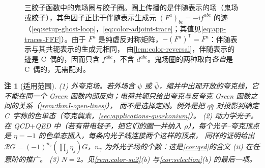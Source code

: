 \documentclass[UTF8,a4paper,11pt,fontset=fandol]{ctexart}
\theoremstyle{cplain}
\theoremstyle{cdefinition}
\theoremstyle{cremark}
\newtheorem{remark}[theorem]{注}
\numberwithin{equation}{section}
\DeclareMathOperator{\Tr}{Tr}
\newcommand{\tp}{\mathsf{T}}                         %
\newcommand{\Rop}{\mathcal{R}}                       %
\newcommand{\ii}{\mathrm{i}}                        %
\begin{document}
\begin{figure}[htbp]
\centering
{}
\caption{三胶子函数中的鬼场圈与胶子圈。圈上传播的是伴随表示的场（鬼场或胶子），其色因子正比于伴随表示生成元 $(F^a)_{bc}=-\ii f^{abc}$ 的迹
（\cref{eq:setup-ghost-loop}，\cref{eq:color-adjoint-trace}；其值见\cref{eq:app-traces-FFF}）。由于 $F^a$ 是纯虚反对称矩阵，$-(F^a)^{\tp}=F^a$：伴随表示与其共轭表示的生成元相同，
由\cref{lem:color-reversal}，伴随表示的迹是 C~偶的，因而只含 $f^{abc}$，不含 $d^{abc}$。鬼场圈的两种取向\emph{各自}是 C~偶的，无需配对。}
\label{fig:adjoint-loops}
\end{figure}

\begin{remark}[适用范围]\label{rem:thmII-scope}
(1) \emph{外夸克场。}若外场含 $\psi$ 或 $\bar\psi$，缩并中出现开放的夸克线，它不能在同一个 Green 函数内部反向；电荷共轭只给出夸克与反夸克 Green 函数之间的关系（\cref{rem:thmI-open-lines}），
而不是选择定则。例外是把 $q\bar q$ 对投影到确定 C~宇称的色单态（夸克偶素，\cref{sec:applications-quarkonium}）。
(2) \emph{动力学光子。}在 QCD$+$QED 中（若有带电轻子，把它们的圈一并纳入 $\rho$），每个光子--夸克顶点是 $\eta=-1$ 的色单态插入，每条内光子线连接两个这样的顶点，
同样的证明给出 $\Rop G=(-1)^{n_\gamma}(\prod_j\eta_j)G$，$n_\gamma$ 为外光子场的个数：这是\cref{cor:qed}的含义 (ii) 在任意阶的推广。
(3) \emph{$N=2$。}见\cref{rem:color-su2}(b) 与\cref{cor:selection}(b) 的最后一项。
\end{remark}
\end{document}
